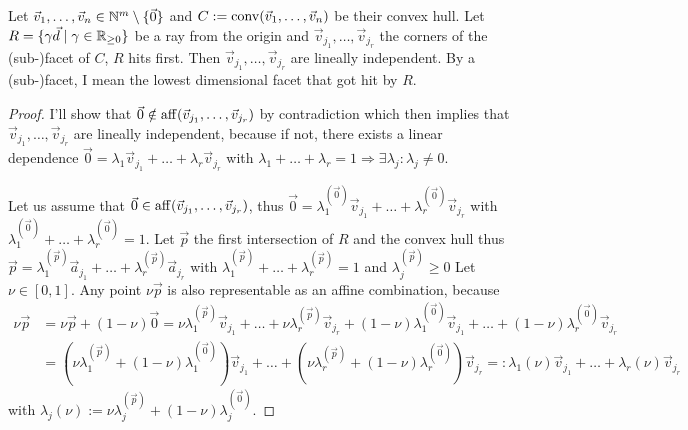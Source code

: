 \begin{lemma}
    \label{lemma:visible_facets_are_linearly_independent}
    Let $\vec v_1, \dots, \vec v_n \in \mathbb{N}^m \setminus\{\vec0\}$ and $C := \operatorname{conv}(\vec v_1, \dots, \vec v_n)$ be their convex hull. Let $R = \{\gamma \vec d \mid \gamma \in \mathbb{R}_{\geq 0}\}$ be a ray from the origin and $\vec v_{j_1}, \dots, \vec v_{j_r}$ the corners of the (sub-)facet of $C$, $R$ hits first. Then $\vec v_{j_1}, \dots, \vec v_{j_r}$ are lineally independent. By a (sub-)facet, I mean the lowest dimensional facet that got hit by $R$.
\end{lemma}
\begin{proof}
    I'll show that $\vec 0 \notin \operatorname{aff}(\vec v_{j_1}, \dots, \vec v_{j_r})$ by contradiction which then implies that $\vec v_{j_1}, \dots, \vec v_{j_r}$ are lineally independent, because if not, there exists a linear dependence $\vec 0 = \lambda_1\vec v_{j_1} + \dots + \lambda_r\vec v_{j_r}$ with $\lambda_1 + \dots + \lambda_r = 1 \Rightarrow\exists\lambda_j\colon\lambda_j \neq 0$. 
    
    Let us assume that $\vec 0 \in \operatorname{aff}(\vec v_{j_1}, \dots, \vec v_{j_r})$, thus $\vec 0 = \lambda^{(\vec 0)}_1 \vec v_{j_1} + \dots + \lambda^{(\vec 0)}_r \vec v_{j_r}$ with $\lambda^{(\vec 0)}_1 + \dots + \lambda^{(\vec 0)}_r = 1$. Let $\vec p$ the first intersection of $R$ and the convex hull thus $\vec p = \lambda^{(\vec p)}_1 \vec a_{j_1} + \dots + \lambda^{(\vec p)}_r \vec a_{j_r}$ with $\lambda^{(\vec p)}_1 + \dots + \lambda^{(\vec p)}_r = 1$ and $\lambda^{(\vec p)}_j \geq 0$ Let $\nu \in [0, 1]$. Any point $\nu\vec p$ is also representable as an affine combination, because
    \begin{align*}
        \nu \vec p &= \nu \vec p + (1-\nu)\vec 0 = \nu\lambda^{(\vec p)}_1 \vec v_{j_1} + \dots + \nu\lambda^{(\vec p)}_r \vec v_{j_r} + (1-\nu)\lambda^{(\vec 0)}_1 \vec v_{j_1} + \dots + (1-\nu)\lambda^{(\vec 0)}_r \vec v_{j_r}\\
        &=(\nu\lambda^{(\vec p)}_1 + (1-\nu)\lambda^{(\vec 0)}_1)\vec v_{j_1} + \dots + (\nu\lambda^{(\vec p)}_r + (1-\nu)\lambda^{(\vec 0)}_r)\vec v_{j_r} =: \lambda_1(\nu)\vec v_{j_1} + \dots + \lambda_r(\nu)\vec v_{j_r}
    \end{align*}
    with $\lambda_j(\nu) := \nu\lambda^{(\vec p)}_j + (1-\nu)\lambda^{(\vec 0)}_j$.


\end{proof}
